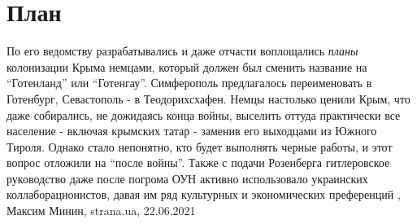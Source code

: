 
 
 
 
 
\chapter{План}

По его ведомству разрабатывались и даже отчасти воплощались \emph{планы} колонизации
Крыма немцами, который должен был сменить название на \enquote{Готенланд} или
\enquote{Готенгау}. Симферополь предлагалось переименовать в Готенбург, Севастополь - в
Теодорихсхафен.  Немцы настолько ценили Крым, что даже собирались, не дожидаясь
конца войны, выселить оттуда практически все население - включая крымских татар
- заменив его выходцами из Южного Тироля. Однако стало непонятно, кто будет
выполнять черные работы, и этот вопрос отложили на \enquote{после войны}.  Также с
подачи Розенберга гитлеровское руководство даже после погрома ОУН активно
использовало украинских коллаборационистов, давая им ряд культурных и
экономических преференций
  , Максим Минин, strana.ua, 22.06.2021
